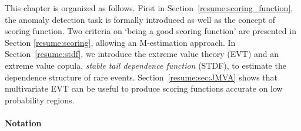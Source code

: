 This chapter is organized as follows.
First in Section~\ref{resume:scoring_function}, the anomaly detection task is formally introduced as well as the concept of scoring function. Two criteria on `being a good scoring function' are presented in Section \ref{resume:scoring}, allowing an M-estimation approach. In Section~\ref{resume:stdf}, we introduce the extreme value theory (EVT) and an extreme value copula, \emph{stable tail dependence function} (STDF), to estimate the dependence structure of rare events. Section~\ref{resume:sec:JMVA} shows that multivariate EVT can be useful to produce scoring functions accurate on low probability regions.


\paragraph{Notation}

